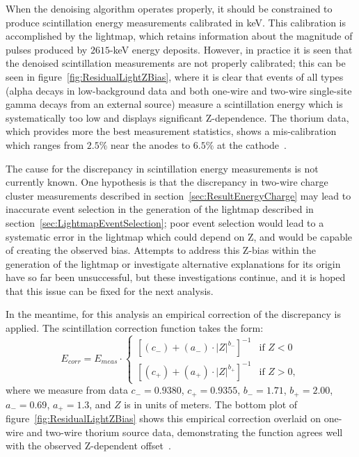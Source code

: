 When the denoising algorithm operates properly, it should be constrained to produce scintillation energy measurements calibrated in keV.  This calibration is accomplished by the lightmap, which retains information about the magnitude of pulses produced by $2615$-keV energy deposits.  However, in practice it is seen that the denoised scintillation measurements are not properly calibrated; this can be seen in figure~\ref{fig:ResidualLightZBias}, where it is clear that events of all types (alpha decays in low-background data and both one-wire and two-wire single-site gamma decays from an external source) measure a scintillation energy which is systematically too low and displays significant Z-dependence.  The thorium data, which provides more the best measurement statistics, shows a mis-calibration which ranges from $2.5\%$ near the anodes to $6.5\%$ at the cathode~\cite{EnergyDocumentRun2ab}.

The cause for the discrepancy in scintillation energy measurements is not currently known.  One hypothesis is that the discrepancy in two-wire charge cluster measurements described in section~\ref{sec:ResultEnergyCharge} may lead to inaccurate event selection in the generation of the lightmap described in section~\ref{sec:LightmapEventSelection}; poor event selection would lead to a systematic error in the lightmap which could depend on Z, and would be capable of creating the observed bias.  Attempts to address this Z-bias within the generation of the lightmap or investigate alternative explanations for its origin have so far been unsuccessful, but these investigations continue, and it is hoped that this issue can be fixed for the next analysis.

In the meantime, for this analysis an empirical correction of the discrepancy is applied.  The scintillation correction function takes the form:
\begin{equation}
E_{corr} = E_{meas}\cdot \begin{cases}
\left[ (c_{-}) + (a_{-})\cdot |Z|^{b_{-}} \right]^{-1} & \text{if } Z < 0\\
\left[ (c_{+}) + (a_{+})\cdot |Z|^{b_{+}} \right]^{-1} & \text{if } Z > 0,
\end{cases}\end{equation}
where we measure from data $c_{-} = 0.9380$, $c_{+} = 0.9355$, $b_{-} = 1.71$, $b_{+} = 2.00$, $a_{-} = 0.69$, $a_{+} = 1.3$, and $Z$ is in units of meters.  The bottom plot of figure~\ref{fig:ResidualLightZBias} shows this empirical correction overlaid on one-wire and two-wire thorium source data, demonstrating the function agrees well with the observed Z-dependent offset~\cite{EnergyDocumentRun2ab}.

